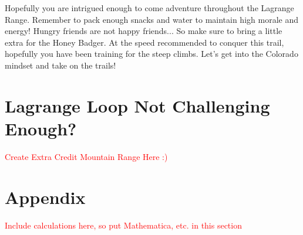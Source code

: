 \documentclass[12pt]{article}   %
\theoremstyle{definition}
\numberwithin{equation}{section}
\begin{document}
\quad Hopefully you are intrigued enough to come adventure throughout the Lagrange Range. Remember to pack enough snacks and water to maintain high morale and energy! Hungry friends are not happy friends... So make sure to bring a little extra for the Honey Badger. At the speed recommended to conquer this trail, hopefully you have been training for the steep climbs. Let's get into the Colorado mindset and take on the trails!

\section{Lagrange Loop Not Challenging Enough?} \label{APPM2350proj02sec07}

\textcolor{red}{Create Extra Credit Mountain Range Here :)}

\section{Appendix} \label{APPM2350proj02sec08}

\textcolor{red}{Include calculations here, so put Mathematica, etc. in this section}

\end{document}
